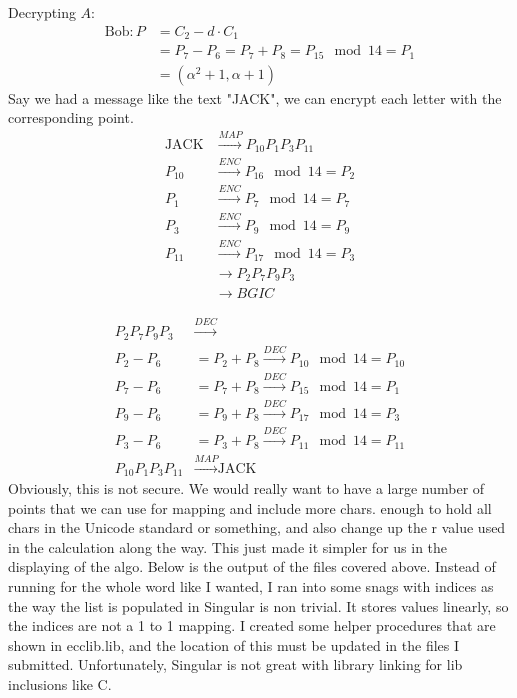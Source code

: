 \documentclass[a4paper,11pt]{exam}
\begin{document}
Decrypting \(A\):
\begin{align*}
\text{Bob} : P &= C_2 - d\cdot C_1\\
&= P_7 - P_6 = P_7 + P_8 = P_{15}\mod{14} = P_1\\
&= (\alpha^2+1, \alpha+1)
\end{align*}
Say we had a message like the text "JACK", we can encrypt each letter with the corresponding point.
\begin{align*}
\text{JACK} &\xrightarrow{MAP}P_{10}P_{1}P_{3}P_{11}\\
P_{10} &\xrightarrow{ENC} P_{16}\mod{14} = P_{2}\\
P_{1} &\xrightarrow{ENC} P_{7}\mod{14} = P_{7}\\
P_{3} &\xrightarrow{ENC} P_{9}\mod{14} = P_{9}\\
P_{11} &\xrightarrow{ENC} P_{17}\mod{14} = P_{3}\\
 &\xrightarrow{} P_{2}P_{7}P_{9}P_{3}\\
 &\xrightarrow{} BGIC
\end{align*}

\begin{align*}
P_{2}P_{7}P_{9}P_{3}&\xrightarrow{DEC} \\
P_{2} - P_6 &= P_{2} + P_{8} \xrightarrow{DEC} P_{10}\mod{14} = P_{10}\\
P_{7} - P_6 &= P_{7} + P_{8} \xrightarrow{DEC} P_{15}\mod{14} = P_{1}\\
P_{9} - P_6 &= P_{9} + P_{8} \xrightarrow{DEC} P_{17}\mod{14} = P_{3}\\
P_{3} - P_6 &= P_{3} + P_{8} \xrightarrow{DEC} P_{11}\mod{14} = P_{11}\\
P_{10}P_{1}P_{3}P_{11}&\xrightarrow{MAP}\text{JACK}
 \end{align*}
Obviously, this is not secure. We would really want to have a large number of points that we can use for mapping and include more chars. enough to hold all chars in the Unicode standard or something, and also change up the r value used in the calculation along the way. This just made it simpler for us in the displaying of the algo. Below is the output of the files covered above. Instead of running for the whole word like I wanted, I ran into some snags with indices as the way the list is populated in Singular is non trivial. It stores values linearly, so the indices are not a 1 to 1 mapping. I created some helper procedures that are shown in ecclib.lib, and the location of this must be updated in the files I submitted. Unfortunately, Singular is not great with library linking for lib inclusions like C. 
\end{document}
